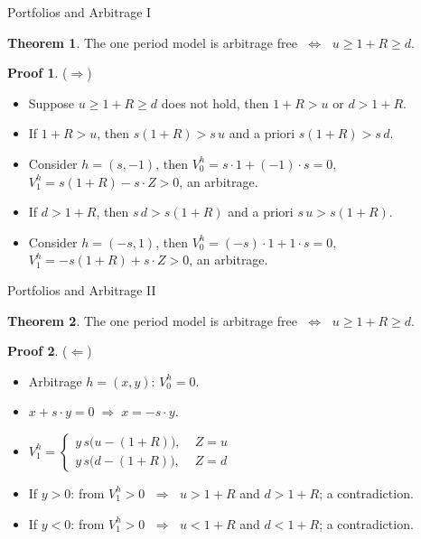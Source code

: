 \documentclass[10pt,handout]{beamer}
\newcommand{\ds}{\displaystyle}
\newcommand{\ie}{\;\Longrightarrow\;}
\newcommand{\ifff}{\;\Longleftrightarrow\;}
\theoremstyle{definition}
\newtheorem*{thm}{Theorem}
\newtheorem*{prf}{Proof}
\begin{document}
\begin{frame}{Portfolios and Arbitrage I}
  \begin{thm}
    The one period model is arbitrage free $\ifff$ $\ds u\geqslant 1+R \geqslant d$.
  \end{thm}
  \begin{prf}
    ($\Longrightarrow$)
    \begin{itemize}
      \item Suppose $u\geqslant 1+R \geqslant d$ does not hold, then $1 + R > u$ or $d > 1 + R$.
      \item If $1 + R > u$, then $s(1 + R) > s\,u$ and a priori $s(1+R) > s\,d$.
      \item Consider $h = (s, -1)$, then $V_0^h = s\cdot 1 + (-1)\cdot s = 0$, $V_1^h = s(1 + R) - s\cdot Z >0$, an arbitrage.
      \item If $d > 1 + R$, then $s\,d > s(1 + R)$ and a priori $s\,u > s(1 + R)$.
      \item Consider $h = (-s, 1)$, then $V_0^h = (-s)\cdot 1 + 1\cdot s = 0$, $V_1^h = -s(1 + R) + s\cdot Z > 0$, an arbitrage.
    \end{itemize}
  \end{prf}
\end{frame}
\begin{frame}{Portfolios and Arbitrage II}
  \begin{thm}
    The one period model is arbitrage free $\ifff$ $\ds u\geqslant 1+R \geqslant d$.
  \end{thm}
  \begin{prf}
    ($\Longleftarrow$)
    \begin{itemize}
      \item Arbitrage $h = (x, y)$: $V_0^h = 0$.
      \item $ x + s\cdot y = 0\ie x= -s\cdot y$. 
      \item $\ds V_1^h = \begin{cases}y\,s\big(u - (1 + R)\big),&\; Z=u \\ y\,s\big(d - (1 + R)\big),&\; Z=d\end{cases}$
      \item If $y > 0$: from $\ds V_1^h > 0$ $\ie$ $u > 1 + R$ and $d > 1 + R$; a contradiction.
      \item If $y < 0$: from $\ds V_1^h > 0$ $\ie$ $u < 1 + R$ and $d < 1 + R$; a contradiction.
    \end{itemize}
  \end{prf}
\end{frame}
\end{document}
